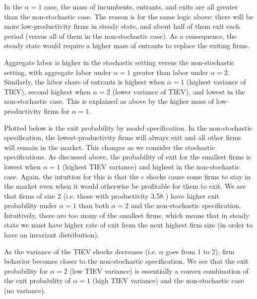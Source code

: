 \documentclass[12pt]{article}
\begin{document}
In the $\alpha = 1$ case, the mass of incumbents, entrants, and exits are all greater than the non-stochastic case. The reason is for the same logic above: there will be more low-productivity firms in steady state, and about half of them exit each period (versus all of them in the non-stochastic case). As a consequence, the steady state would require a higher mass of entrants to replace the exiting firms.

Aggregate labor is higher in the stochastic setting versus the non-stochastic setting, with aggregate labor under $\alpha = 1$ greater than labor under $\alpha = 2$. Similarly, the labor share of entrants is highest when $\alpha = 1$ (highest variance of TIEV), second highest when $\alpha = 2$ (lower variance of TIEV), and lowest in the non-stochastic case. This is explained as above by the higher mass of low-productivity firms for $\alpha = 1$. 

Plotted below is the exit probability by model specification. In the non-stochastic specification, the lowest-productivity firms will always exit and all other firms will remain in the market. This changes as we consider the stochastic specifications. As discussed above, the probability of exit for the smallest firms is lowest when $\alpha = 1$ (highest TIEV variance) and highest in the non-stochastic case. Again, the intuition for this is that the $\epsilon$ shocks cause some firms to stay in the market even when it would otherwise be profitable for them to exit. We see that firms of size 2 (i.e. those with productivity 3.58 ) have higher exit probability under $\alpha = 1$ than both $\alpha = 2$ and the non-stochastic specification. Intuitively, there are too many of the smallest firms, which means that in steady state we must have higher rate of exit from the next highest firm size (in order to have an invariant distribution). 

As the variance of the TIEV shocks decreases (i.e. $\alpha$ goes from 1 to 2), firm behavior becomes closer to the non-stochastic specification. We see that the exit probability for $\alpha = 2$ (low TIEV variance) is essentially a convex combination of the exit probability of $\alpha = 1$ (high TIEV variance) and the non-stochastic case (no variance). 
\end{document}
